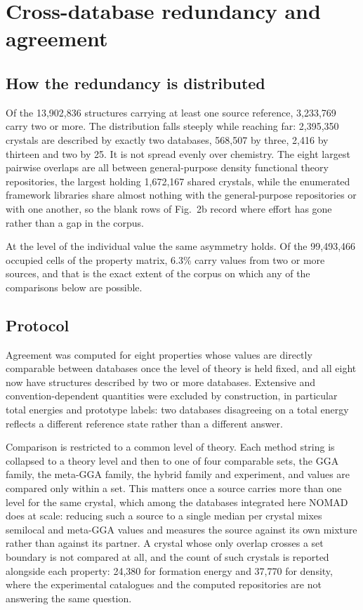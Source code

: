 \section{Cross-database redundancy and agreement}\label{note:agreement}

\subsection{How the redundancy is distributed}

Of the 13{,}902{,}836 structures carrying at least one source reference,
3{,}233{,}769 carry two or more. The distribution falls steeply while reaching
far: 2{,}395{,}350 crystals are described by exactly two databases, 568{,}507 by
three, 2{,}416 by thirteen and two by 25. It is not spread evenly over chemistry.
The eight largest pairwise overlaps are all between general-purpose density
functional theory repositories, the largest holding 1{,}672{,}167 shared
crystals, while the enumerated framework libraries share almost nothing with the
general-purpose repositories or with one another, so the blank rows of Fig.~2b
record where effort has gone rather than a gap in the corpus.

At the level of the individual value the same asymmetry holds. Of the
99{,}493{,}466 occupied cells of the property matrix, 6.3\% carry values from two
or more sources, and that is the exact extent of the corpus on which any of the
comparisons below are possible.

\subsection{Protocol}

Agreement was computed for eight properties whose values are directly comparable
between databases once the level of theory is held fixed, and all eight now have
structures described by two or more databases. Extensive and
convention-dependent quantities were excluded by construction, in particular
total energies and prototype labels: two databases disagreeing on a total energy
reflects a different reference state rather than a different answer.

Comparison is restricted to a common level of theory. Each method string is
collapsed to a theory level and then to one of four comparable sets, the GGA
family, the meta-GGA family, the hybrid family and experiment, and values are
compared only within a set. This matters once a source carries more than one
level for the same crystal, which among the databases integrated here NOMAD does
at scale: reducing such a source to a single median per crystal mixes semilocal
and meta-GGA values and measures the source against its own mixture rather than
against its partner. A crystal whose only overlap crosses a set boundary is not
compared at all, and the count of such crystals is reported alongside each
property: 24{,}380 for formation energy and 37{,}770 for density, where the
experimental catalogues and the computed repositories are not answering the same
question.


